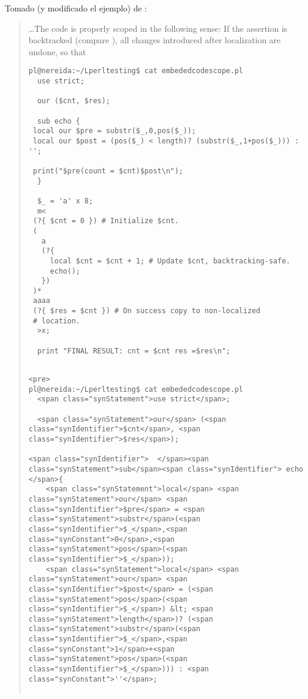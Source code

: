 Tomado (y modificado el ejemplo) de :

\begin{it}\begin{quote}
\ldots The code  is properly scoped in the following sense: If the
assertion is backtracked (compare ), all changes introduced
after localization are undone, so that

\begin{latexonly}
\begin{verbatim}
pl@nereida:~/Lperltesting$ cat embededcodescope.pl
  use strict;

  our ($cnt, $res);

  sub echo {
 local our $pre = substr($_,0,pos($_));
 local our $post = (pos($_) < length)? (substr($_,1+pos($_))) : '';

 print("$pre(count = $cnt)$post\n");
  }

  $_ = 'a' x 8;
  m<
 (?{ $cnt = 0 }) # Initialize $cnt.
 (
   a
   (?{
     local $cnt = $cnt + 1; # Update $cnt, backtracking-safe.
     echo();
   })
 )*
 aaaa
 (?{ $res = $cnt }) # On success copy to non-localized
 # location.
  >x;

  print "FINAL RESULT: cnt = $cnt res =$res\n";
\end{verbatim}
\end{latexonly}
\begin{verbatim}

<pre>
pl@nereida:~/Lperltesting$ cat embededcodescope.pl
  <span class="synStatement">use strict</span>;

  <span class="synStatement">our</span> (<span class="synIdentifier">$cnt</span>, <span class="synIdentifier">$res</span>);

<span class="synIdentifier">  </span><span class="synStatement">sub</span><span class="synIdentifier"> echo </span>{
    <span class="synStatement">local</span> <span class="synStatement">our</span> <span class="synIdentifier">$pre</span> = <span class="synStatement">substr</span>(<span class="synIdentifier">$_</span>,<span class="synConstant">0</span>,<span class="synStatement">pos</span>(<span class="synIdentifier">$_</span>));
    <span class="synStatement">local</span> <span class="synStatement">our</span> <span class="synIdentifier">$post</span> = (<span class="synStatement">pos</span>(<span class="synIdentifier">$_</span>) &lt; <span class="synStatement">length</span>)? (<span class="synStatement">substr</span>(<span class="synIdentifier">$_</span>,<span class="synConstant">1</span>+<span class="synStatement">pos</span>(<span class="synIdentifier">$_</span>))) : <span class="synConstant">''</span>;


\end{verbatim}
\end{quote}
\end{it}
